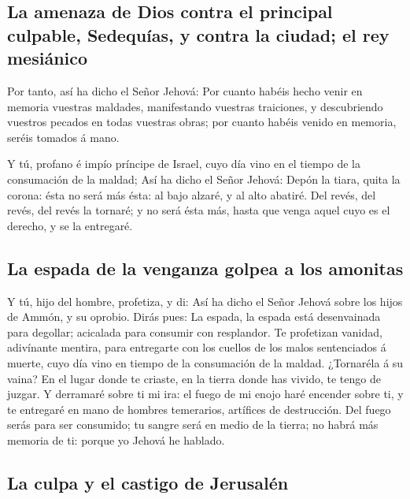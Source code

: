 \hypertarget{la-amenaza-de-dios-contra-el-principal-culpable-sedequuxedas-y-contra-la-ciudad-el-rey-mesiuxe1nico}{%
\subsection{La amenaza de Dios contra el principal culpable, Sedequías,
y contra la ciudad; el rey
mesiánico}\label{la-amenaza-de-dios-contra-el-principal-culpable-sedequuxedas-y-contra-la-ciudad-el-rey-mesiuxe1nico}}

 Por tanto, así ha dicho el Señor Jehová: Por cuanto habéis
hecho venir en memoria vuestras maldades, manifestando vuestras
traiciones, y descubriendo vuestros pecados en todas vuestras obras; por
cuanto habéis venido en memoria, seréis tomados á mano.

 Y tú, profano é impío príncipe de Israel, cuyo día vino en
el tiempo de la consumación de la maldad;  Así ha dicho el
Señor Jehová: Depón la tiara, quita la corona: ésta no será más ésta: al
bajo alzaré, y al alto abatiré.  Del revés, del revés, del
revés la tornaré; y no será ésta más, hasta que venga aquel cuyo es el
derecho, y se la entregaré.

\hypertarget{la-espada-de-la-venganza-golpea-a-los-amonitas}{%
\subsection{La espada de la venganza golpea a los
amonitas}\label{la-espada-de-la-venganza-golpea-a-los-amonitas}}

 Y tú, hijo del hombre, profetiza, y di: Así ha dicho el
Señor Jehová sobre los hijos de Ammón, y su oprobio. Dirás pues: La
espada, la espada está desenvainada para degollar; acicalada para
consumir con resplandor.  Te profetizan vanidad, adivínante
mentira, para entregarte con los cuellos de los malos sentenciados á
muerte, cuyo día vino en tiempo de la consumación de la maldad.
 ¿Tornaréla á su vaina? En el lugar donde te criaste, en la
tierra donde has vivido, te tengo de juzgar.  Y derramaré
sobre ti mi ira: el fuego de mi enojo haré encender sobre ti, y te
entregaré en mano de hombres temerarios, artífices de destrucción.
 Del fuego serás para ser consumido; tu sangre será en
medio de la tierra; no habrá más memoria de ti: porque yo Jehová he
hablado.

\hypertarget{la-culpa-y-el-castigo-de-jerusaluxe9n}{%
\subsection{La culpa y el castigo de
Jerusalén}\label{la-culpa-y-el-castigo-de-jerusaluxe9n}}

